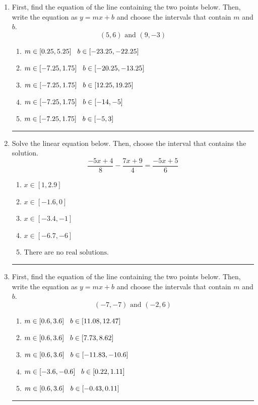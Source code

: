 \documentclass[14pt]{extbook}
\newcommand{\litem}[1]{\item#1\hspace*{-1cm}\rule{\textwidth}{0.4pt}}
\begin{document}
\begin{enumerate}
\litem{
First, find the equation of the line containing the two points below. Then, write the equation as $ y=mx+b $ and choose the intervals that contain $m$ and $b$.\[ (5, 6) \text{ and } (9, -3) \]\begin{enumerate}[label=\Alph*.]
\item \( m \in [0.25, 5.25] \hspace*{3mm} b \in [-23.25, -22.25] \)
\item \( m \in [-7.25, 1.75] \hspace*{3mm} b \in [-20.25, -13.25] \)
\item \( m \in [-7.25, 1.75] \hspace*{3mm} b \in [12.25, 19.25] \)
\item \( m \in [-7.25, 1.75] \hspace*{3mm} b \in [-14, -5] \)
\item \( m \in [-7.25, 1.75] \hspace*{3mm} b \in [-5, 3] \)

\end{enumerate} }
\litem{
Solve the linear equation below. Then, choose the interval that contains the solution.\[ \frac{-5x + 4}{8} - \frac{7x + 9}{4} = \frac{-5x + 5}{6} \]\begin{enumerate}[label=\Alph*.]
\item \( x \in [1, 2.9] \)
\item \( x \in [-1.6, 0] \)
\item \( x \in [-3.4, -1] \)
\item \( x \in [-6.7, -6] \)
\item \( \text{There are no real solutions.} \)

\end{enumerate} }
\litem{
First, find the equation of the line containing the two points below. Then, write the equation as $ y=mx+b $ and choose the intervals that contain $m$ and $b$.\[ (-7, -7) \text{ and } (-2, 6) \]\begin{enumerate}[label=\Alph*.]
\item \( m \in [0.6, 3.6] \hspace*{3mm} b \in [11.08, 12.47] \)
\item \( m \in [0.6, 3.6] \hspace*{3mm} b \in [7.73, 8.62] \)
\item \( m \in [0.6, 3.6] \hspace*{3mm} b \in [-11.83, -10.6] \)
\item \( m \in [-3.6, -0.6] \hspace*{3mm} b \in [0.22, 1.11] \)
\item \( m \in [0.6, 3.6] \hspace*{3mm} b \in [-0.43, 0.11] \)


\end{enumerate}}
\end{enumerate}
\end{document}
